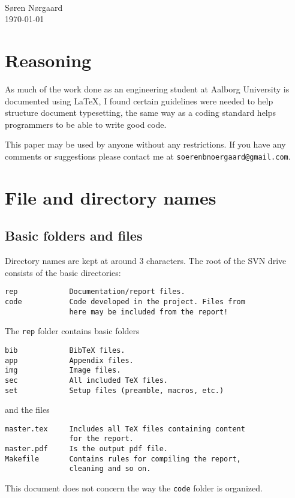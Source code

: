 

{  %
    \flushleft
    \Large {}\\
    \large \sffamily Søren Nørgaard\\
    \today\\
}\vspace{2em}


\section*{Reasoning}
\label{sec:reasoning}
As much of the work done as an engineering student at Aalborg University is documented using \LaTeX, I found certain guidelines were needed to help structure document typesetting, the same way as a coding standard helps programmers to be able to write good code.


This paper may be used by anyone without any restrictions. If you have any comments or suggestions please contact me at \texttt{soerenbnoergaard@gmail.com}.




\section{File and directory names}
\label{sec:files}


\subsection{Basic folders and files}
Directory names are kept at around 3 characters. The root of the SVN drive consists of the basic directories:
\begin{verbatim}
rep            Documentation/report files.
code           Code developed in the project. Files from 
               here may be included from the report!
\end{verbatim} 
The \texttt{rep} folder contains basic folders
\begin{verbatim}
bib            BibTeX files.
app            Appendix files.
img            Image files.
sec            All included TeX files.
set            Setup files (preamble, macros, etc.)
\end{verbatim}
and the files
\begin{verbatim}
master.tex     Includes all TeX files containing content 
               for the report.
master.pdf     Is the output pdf file.
Makefile       Contains rules for compiling the report, 
               cleaning and so on.
\end{verbatim}
This document does not concern the way the \texttt{code} folder is organized.


